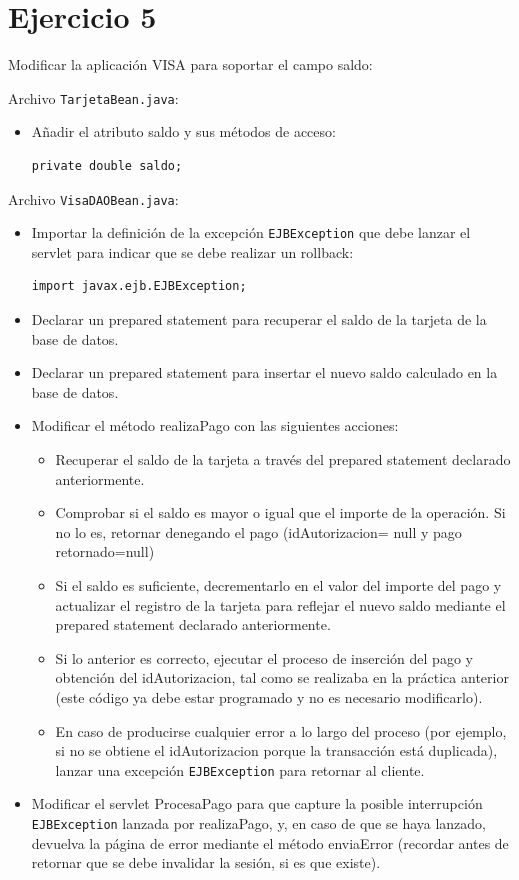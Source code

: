 \documentclass[a4paper, 10pt]{article}
\begin{document}
 \section{Ejercicio 5}
 \begin{mdframed}
Modificar la aplicación VISA para soportar el campo saldo:
\vspace{5mm}

\lstset{language=java}
\noindent Archivo \texttt{TarjetaBean.java}:
\begin{itemize}
\item Añadir el atributo saldo y sus métodos de acceso:
\begin{lstlisting}
private double saldo;
\end{lstlisting}
\end{itemize}
Archivo \texttt{VisaDAOBean.java}:
\begin{itemize}
\item Importar la definición de la excepción \texttt{EJBException} que debe lanzar el servlet para indicar que se
debe realizar un rollback:
\begin{lstlisting}
import javax.ejb.EJBException;
\end{lstlisting}
\item Declarar un prepared statement para recuperar el saldo de la tarjeta de la base de datos.
\item Declarar un prepared statement para insertar el nuevo saldo calculado en la base de datos.
\item Modificar el método realizaPago con las siguientes acciones:
\begin{itemize}
\item Recuperar el saldo de la tarjeta a través del prepared statement declarado anteriormente.
\item Comprobar si el saldo es mayor o igual que el importe de la operación. Si no lo es, retornar
denegando el pago (idAutorizacion= null y pago retornado=null)
\item Si el saldo es suficiente, decrementarlo en el valor del importe del pago y actualizar el registro
de la tarjeta para reflejar el nuevo saldo mediante el prepared statement declarado
anteriormente.
\item Si lo anterior es correcto, ejecutar el proceso de inserción del pago y obtención del
idAutorizacion, tal como se realizaba en la práctica anterior (este código ya debe estar
programado y no es necesario modificarlo).
\item En caso de producirse cualquier error a lo largo del proceso (por ejemplo, si no se obtiene el
idAutorizacion porque la transacción está duplicada), lanzar una excepción \texttt{EJBException} para
retornar al cliente.
\end{itemize}
\item Modificar el servlet ProcesaPago para que capture la posible interrupción \texttt{EJBException} lanzada por
realizaPago, y, en caso de que se haya lanzado, devuelva la página de error mediante el método
enviaError (recordar antes de retornar que se debe invalidar la sesión, si es que existe).
\end{itemize}
\end{mdframed}
\end{document}

